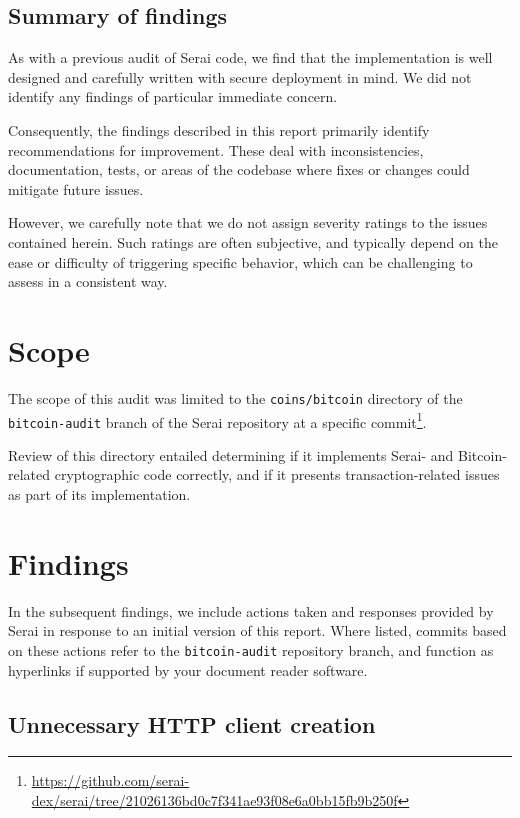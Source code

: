 \documentclass{article}
\begin{document}
\subsection{Summary of findings}

As with a previous audit of Serai code, we find that the implementation is well designed and carefully written with secure deployment in mind.
We did not identify any findings of particular immediate concern.

Consequently, the findings described in this report primarily identify recommendations for improvement.
These deal with inconsistencies, documentation, tests, or areas of the codebase where fixes or changes could mitigate future issues.

However, we carefully note that we do not assign severity ratings to the issues contained herein.
Such ratings are often subjective, and typically depend on the ease or difficulty of triggering specific behavior, which can be challenging to assess in a consistent way.


\section{Scope}

The scope of this audit was limited to the \texttt{coins/bitcoin} directory of the \texttt{bitcoin-audit} branch of the Serai repository at a specific commit\footnote{\url{https://github.com/serai-dex/serai/tree/21026136bd0c7f341ae93f08e6a0bb15fb9b250f}}.

Review of this directory entailed determining if it implements Serai- and Bitcoin-related cryptographic code correctly, and if it presents transaction-related issues as part of its implementation.


\section{Findings}

In the subsequent findings, we include actions taken and responses provided by Serai in response to an initial version of this report.
Where listed, commits based on these actions refer to the \texttt{bitcoin-audit} repository branch, and function as hyperlinks if supported by your document reader software.


\subsection{Unnecessary HTTP client creation}
\end{document}
